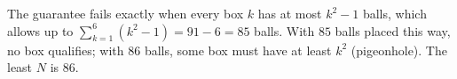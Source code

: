 The guarantee fails exactly when every box $k$ has at most $k^2-1$ balls, which allows up to $\sum_{k=1}^6(k^2-1)=91-6=85$ balls. With $85$ balls placed this way, no box qualifies; with $86$ balls, some box must have at least $k^2$ (pigeonhole). The least $N$ is $\boxed{86}$.
